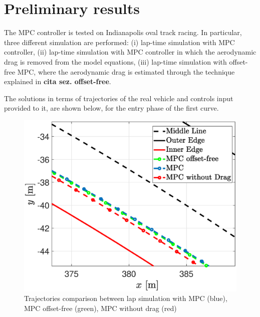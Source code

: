 \documentclass[conference]{IEEEtran} %
\begin{document}






\section{Preliminary results}
The MPC controller is tested on Indianapolis oval track racing. In particular, three different simulation are performed: (i) lap-time simulation with MPC controller, (ii) lap-time simulation with MPC controller in which the aerodynamic drag is removed from the model equations, (iii) lap-time simulation with offset-free MPC, where the aerodynamic drag is estimated through the technique explained in \textbf{cita sez. offset-free}.

The solutions in terms of trajectories of the real vehicle and controls input provided to it, are shown below, for the entry phase of the first curve. 

\begin{figure}[htb] \centering
    \includegraphics[width=1.\linewidth]{Trajectories2}
	\caption{Trajectories comparison between lap simulation with MPC (blue), MPC offset-free (green), MPC without drag (red)}
	\label{fig:Trajectories2}
\end{figure}
\end{document}
